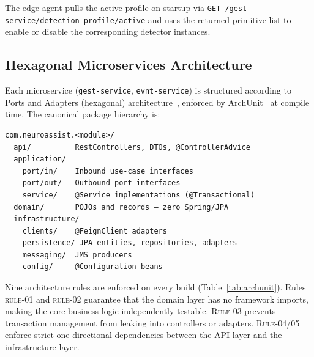 The edge agent pulls the active profile on startup via \texttt{GET
/gest-service/detection-profile/active} and uses the returned primitive list to
enable or disable the corresponding detector instances.

\subsection{Hexagonal Microservices Architecture}
\label{sec:hexagonal}

Each microservice (\texttt{gest-service}, \texttt{evnt-service}) is structured according
to Ports and Adapters (hexagonal) architecture~\cite{cockburn2005hexagonal}, enforced by
ArchUnit~\cite{archunit} at compile time. The canonical package hierarchy is:

\begin{small}
\begin{verbatim}
com.neuroassist.<module>/
  api/          RestControllers, DTOs, @ControllerAdvice
  application/
    port/in/    Inbound use-case interfaces
    port/out/   Outbound port interfaces
    service/    @Service implementations (@Transactional)
  domain/       POJOs and records — zero Spring/JPA
  infrastructure/
    clients/    @FeignClient adapters
    persistence/ JPA entities, repositories, adapters
    messaging/  JMS producers
    config/     @Configuration beans
\end{verbatim}
\end{small}

Nine architecture rules are enforced on every build
(Table~\ref{tab:archunit}). Rules \textsc{rule-01} and \textsc{rule-02} guarantee that
the domain layer has no framework imports, making the core business logic independently
testable. \textsc{Rule-03} prevents transaction management from leaking into controllers
or adapters. \textsc{Rule-04}/\textsc{05} enforce strict one-directional dependencies
between the API layer and the infrastructure layer.

